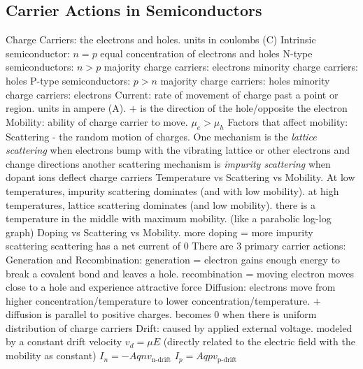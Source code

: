 \documentclass[a4paper,11pt]{article}
\begin{document}
	\subsection{Carrier Actions in Semiconductors}
	\begin{outline}[enumerate]
		\1 Charge Carriers: the electrons and holes. units in coulombs (C)
		\1 Intrinsic semiconductor: $n = p$ equal concentration of electrons and holes
		\1 N-type semiconductors:
			\2 $n > p$
			\2 majority charge carriers: electrons
			\2 minority charge carriers: holes
		\1 P-type semiconductors:
			\2 $p > n$	
			\2 majority charge carriers: holes
			\2 minority charge carriers: electrons
		\1 Current: rate of movement of charge past a point or region. units in ampere (A). $+$ is the direction of the hole/opposite the electron
		\1 Mobility: ability of charge carrier to move. $\mu_{e} > \mu_{h}$
		\1 Factors that affect mobility:
			\2 Scattering - the random motion of charges. One mechanism is the \textit{lattice scattering} when electrons bump with the vibrating lattice or other electrons and change directions
			\2 another scattering mechanism is \textit{impurity scattering} when dopant ions deflect charge carriers
			\2 Temperature vs Scattering vs Mobility. At low temperatures, impurity scattering dominates (and with low mobility). at high temperatures, lattice scattering dominates (and low mobility). there is a temperature in the middle with maximum mobility. (like a parabolic log-log graph)
			\2 Doping vs Scattering vs Mobility. more doping = more impurity scattering 
			\2 scattering has a net current of $0$ 
		\1 There are 3 primary carrier actions:
			\2 Generation and Recombination: generation = electron gains enough energy to break a covalent bond and leaves a hole. recombination = moving electron moves close to a hole and experience attractive force 
			\2 Diffusion: electrons move from higher concentration/temperature to lower concentration/temperature. $+$ diffusion is parallel to positive charges. becomes $0$ when there is uniform distribution of charge carriers 
			\2 Drift: caused by applied external voltage. modeled by a constant drift velocity $v_{d} = \mu E$ (directly related to the electric field with the mobility as constant)
				\3 $I_n = -Aqnv_\text{n-drift}$
				\3 $I_p = Aqpv_\text{p-drift}$
 	\end{outline}
 
\end{document}
